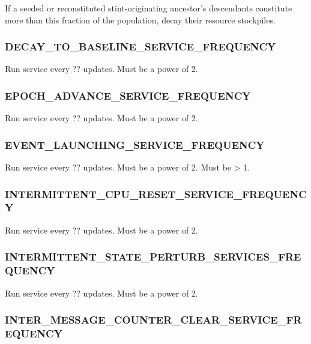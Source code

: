 If a seeded or reconstituted stint-originating ancestor's descendants constitute more than this fraction of the population, decay their resource stockpiles.

\subsubsection{DECAY\_TO\_BASELINE\_SERVICE\_FREQUENCY}


Run service every ?? updates.
Must be a power of 2.

\subsubsection{EPOCH\_ADVANCE\_SERVICE\_FREQUENCY}


Run service every ?? updates.
Must be a power of 2.

\subsubsection{EVENT\_LAUNCHING\_SERVICE\_FREQUENCY}


Run service every ?? updates.
Must be a power of 2.
Must be > 1.

\subsubsection{INTERMITTENT\_CPU\_RESET\_SERVICE\_FREQUENCY}


Run service every ?? updates.
Must be a power of 2.

\subsubsection{INTERMITTENT\_STATE\_PERTURB\_SERVICES\_FREQUENCY}


Run service every ?? updates.
Must be a power of 2.

\subsubsection{INTER\_MESSAGE\_COUNTER\_CLEAR\_SERVICE\_FREQUENCY}


